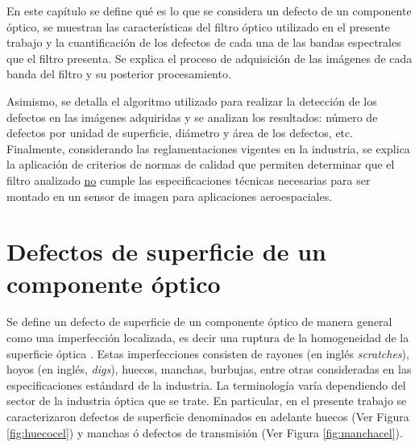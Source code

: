 

\singlespacing
{}

\hspace{0.5cm}En este capítulo se define qué es lo que se considera un defecto de un componente óptico, se muestran las características del filtro óptico utilizado en el presente trabajo y la cuantificación de los defectos de cada una de las bandas espectrales que el filtro presenta. Se explica el proceso de adquisición de las imágenes de cada banda del filtro y su posterior procesamiento. 

Asimismo, se detalla el algoritmo utilizado para realizar la detección de los defectos en las imágenes adquiridas y se analizan los resultados: número de defectos por unidad de superficie, diámetro y área de los defectos, etc. Finalmente, considerando las reglamentaciones vigentes en la industria, se explica la aplicación de criterios de normas de calidad que permiten determinar que el filtro analizado \underline{no} cumple las especificaciones técnicas necesarias para ser montado en un sensor de imagen para aplicaciones aeroespaciales.

\singlespacing
\section{Defectos de superficie de un componente óptico}
\label{sec:defectsurf}



\hspace{0.5cm}Se define un defecto de superficie de un componente óptico de manera general como una imperfección localizada, es decir una ruptura de la homogeneidad de la superficie óptica \cite{Gomez_1998}. Estas imperfecciones consisten de rayones (en inglés \textit{scratches}), hoyos (en inglés, \textit{digs}), huecos, manchas, burbujas, entre otras consideradas en las especificaciones estándard de la industria. La terminología varía dependiendo del sector de la industria óptica que se trate. En particular, en el presente trabajo se caracterizaron defectos de superficie denominados en adelante huecos (Ver Figura \ref{fig:huecocel}) y manchas ó defectos de transmisión (Ver Figura \ref{fig:manchacel}). 


